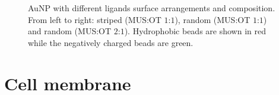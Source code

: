 \begin{figure}[!ht]
	\centering
	\qquad
	\qquad
	\caption{Au\acs{NP} with different ligands surface arrangements and composition. From left to right: striped (\ac{MUS}:\ac{OT} $1$:$1$), random (\ac{MUS}:\ac{OT} $1$:$1$) and random (\ac{MUS}:\ac{OT} $2$:$1$). Hydrophobic beads are shown in red while the negatively charged beads are green.}
	\label{fig:coating}
\end{figure}

\section{Cell membrane}

